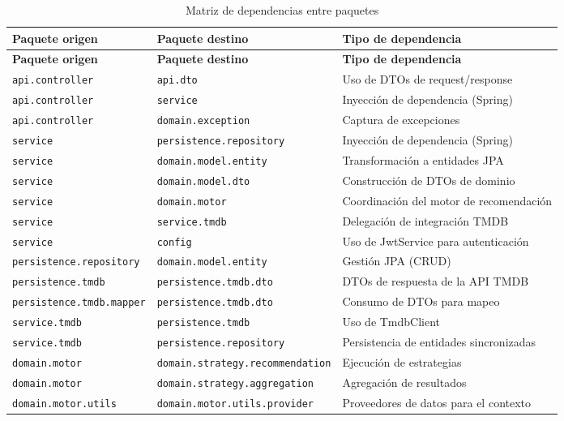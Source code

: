 \begin{longtable}{L{4cm} L{4cm} L{5cm}}
\caption{Matriz de dependencias entre paquetes}\label{tab:dependencias}\\
\toprule
\textbf{Paquete origen} & \textbf{Paquete destino} & \textbf{Tipo de dependencia} \\
\midrule
\endfirsthead
\toprule
\textbf{Paquete origen} & \textbf{Paquete destino} & \textbf{Tipo de dependencia} \\
\midrule
\endhead

\texttt{api.controller} & \texttt{api.dto} & Uso de DTOs de request/response \\
\texttt{api.controller} & \texttt{service} & Inyección de dependencia (Spring) \\
\texttt{api.controller} & \texttt{domain.exception} & Captura de excepciones \\
\texttt{service} & \texttt{persistence.repository} & Inyección de dependencia (Spring) \\
\texttt{service} & \texttt{domain.model.entity} & Transformación a entidades JPA \\
\texttt{service} & \texttt{domain.model.dto} & Construcción de DTOs de dominio \\
\texttt{service} & \texttt{domain.motor} & Coordinación del motor de recomendación \\
\texttt{service} & \texttt{service.tmdb} & Delegación de integración TMDB \\
\texttt{service} & \texttt{config} & Uso de JwtService para autenticación \\
\texttt{persistence.repository} & \texttt{domain.model.entity} & Gestión JPA (CRUD) \\
\texttt{persistence.tmdb} & \texttt{persistence.tmdb.dto} & DTOs de respuesta de la API TMDB \\
\texttt{persistence.tmdb.mapper} & \texttt{persistence.tmdb.dto} & Consumo de DTOs para mapeo \\
\texttt{service.tmdb} & \texttt{persistence.tmdb} & Uso de TmdbClient \\
\texttt{service.tmdb} & \texttt{persistence.repository} & Persistencia de entidades sincronizadas \\
\texttt{domain.motor} & \texttt{domain.strategy.recommendation} & Ejecución de estrategias \\
\texttt{domain.motor} & \texttt{domain.strategy.aggregation} & Agregación de resultados \\
\texttt{domain.motor.utils} & \texttt{domain.motor.utils.provider} & Proveedores de datos para el contexto \\

\end{longtable}
